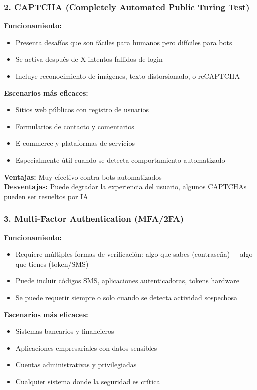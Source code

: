 \documentclass[letter,12pt]{article}
\begin{document}
\subsubsection{2. CAPTCHA (Completely Automated Public Turing Test)}

\textbf{Funcionamiento:}
\begin{itemize}
    \item Presenta desafíos que son fáciles para humanos pero difíciles para bots
    \item Se activa después de X intentos fallidos de login
    \item Incluye reconocimiento de imágenes, texto distorsionado, o reCAPTCHA
\end{itemize}

\textbf{Escenarios más eficaces:}
\begin{itemize}
    \item Sitios web públicos con registro de usuarios
    \item Formularios de contacto y comentarios
    \item E-commerce y plataformas de servicios
    \item Especialmente útil cuando se detecta comportamiento automatizado
\end{itemize}

\textbf{Ventajas:} Muy efectivo contra bots automatizados \\
\textbf{Desventajas:} Puede degradar la experiencia del usuario, algunos CAPTCHAs pueden ser resueltos por IA

\subsubsection{3. Multi-Factor Authentication (MFA/2FA)}

\textbf{Funcionamiento:}
\begin{itemize}
    \item Requiere múltiples formas de verificación: algo que sabes (contraseña) + algo que tienes (token/SMS)
    \item Puede incluir códigos SMS, aplicaciones autenticadoras, tokens hardware
    \item Se puede requerir siempre o solo cuando se detecta actividad sospechosa
\end{itemize}

\textbf{Escenarios más eficaces:}
\begin{itemize}
    \item Sistemas bancarios y financieros
    \item Aplicaciones empresariales con datos sensibles
    \item Cuentas administrativas y privilegiadas
    \item Cualquier sistema donde la seguridad es crítica
\end{itemize}
\end{document}
